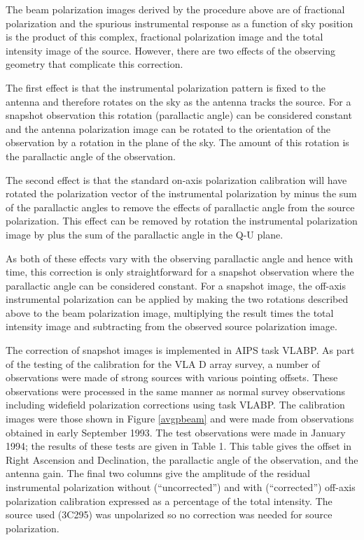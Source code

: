    The beam polarization images derived by the procedure above are
of fractional polarization and the spurious instrumental response as a
function of sky position is the product of this complex, fractional
polarization image and the total intensity image of the source.
However, there are two effects of the observing geometry that
complicate this correction.

   The first effect is that the instrumental polarization pattern is
fixed to the antenna and therefore rotates on the sky as the antenna
tracks the source.  For a snapshot observation this rotation
(parallactic angle) can be considered constant and the antenna
polarization image can be rotated to the orientation of
the observation by a rotation in the plane of the sky.
The amount of this rotation is the parallactic angle of the
observation.

   The second effect is that the standard on-axis polarization
calibration will have rotated the polarization vector of the
instrumental polarization by minus the sum of the parallactic angles to
remove the effects of parallactic angle from the source polarization.
This effect can be removed by rotation the instrumental polarization
image by plus the sum of the parallactic angle in the Q-U plane.

   As both of these effects vary with the observing parallactic angle
and hence with time, this correction is only straightforward for a
snapshot observation where the parallactic angle can be considered
constant.
For a snapshot image, the off-axis instrumental polarization can be
applied by making the two rotations described above to the beam
polarization image, multiplying the result times the total intensity
image and subtracting from the observed source polarization image.


   The correction of snapshot images is implemented in AIPS task
VLABP.  As part of the testing of the calibration for the VLA D array
survey, a number of observations were made of strong sources with
various pointing offsets.  These observations were processed in the
same manner as normal survey observations including widefield
polarization corrections using task VLABP.  The calibration images
were those shown in Figure \ref{avgpbeam} and were made from
observations obtained in early September 1993.  The test observations
were made in January 1994;  the results of these tests are given in
Table 1.  This table gives the offset in Right Ascension and
Declination, the parallactic angle of the observation, and the antenna
gain.
The final two columns give the amplitude of the residual instrumental
polarization without (``uncorrected'') and with (``corrected'')
off-axis polarization calibration expressed as a percentage of the
total intensity.
The source used (3C295) was unpolarized so no correction was needed
for source polarization.

